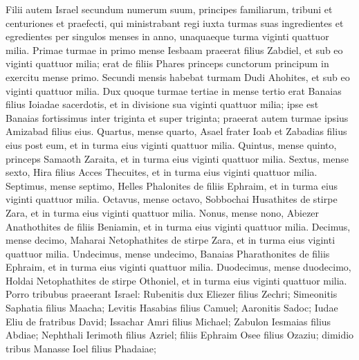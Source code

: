 \begin{biblechapter}
\begin{biblechapter}
\begin{biblechapter}
\begin{biblechapter}
\begin{biblechapter}
\begin{biblechapter}
\begin{biblechapter}
\begin{biblechapter}
\begin{biblechapter}
\begin{biblechapter}
\begin{biblechapter}
\begin{biblechapter}
\begin{biblechapter}
\begin{biblechapter}
\begin{biblechapter}
\begin{biblechapter}
\begin{biblechapter}
\begin{biblechapter}
\begin{biblechapter}
\begin{biblechapter}
\begin{biblechapter}
\begin{biblechapter}
\begin{biblechapter}
\begin{biblechapter}
\begin{biblechapter}
\begin{biblechapter}
\begin{biblechapter}
\verse Filii autem Israel secundum numerum suum, principes familiarum, tribuni et centuriones et praefecti, qui ministrabant regi iuxta turmas suas ingredientes et egredientes per singulos menses in anno, unaquaeque turma viginti quattuor milia. 
\verse Primae turmae in primo mense Iesbaam praeerat filius Zabdiel, et sub eo viginti quattuor milia; 
\verse erat de filiis Phares princeps cunctorum principum in exercitu mense primo. 
\verse Secundi mensis habebat turmam Dudi Ahohites, et sub eo viginti quattuor milia. 
\verse Dux quoque turmae tertiae in mense tertio erat Banaias filius Ioiadae sacerdotis, et in divisione sua viginti quattuor milia; 
\verse ipse est Banaias fortissimus inter triginta et super triginta; praeerat autem turmae ipsius Amizabad filius eius. 
 \verse Quartus, mense quarto, Asael frater Ioab et Zabadias filius eius post eum, et in turma eius viginti quattuor milia. 
\verse Quintus, mense quinto, princeps Samaoth Zaraita, et in turma eius viginti quattuor milia. 
\verse Sextus, mense sexto, Hira filius Acces Thecuites, et in turma eius viginti quattuor milia. 
 \verse Septimus, mense septimo, Helles Phalonites de filiis Ephraim, et in turma eius viginti quattuor milia. 
\verse Octavus, mense octavo, Sobbochai Husathites de stirpe Zara, et in turma eius viginti quattuor milia. 
\verse Nonus, mense nono, Abiezer Anathothites de filiis Beniamin, et in turma eius viginti quattuor milia. 
\verse Decimus, mense decimo, Maharai Netophathites de stirpe Zara, et in turma eius viginti quattuor milia. \verse Undecimus, mense undecimo, Banaias Pharathonites de filiis Ephraim, et in turma eius viginti quattuor milia. 
\verse Duodecimus, mense duodecimo, Holdai Netophathites de stirpe Othoniel, et in turma eius viginti quattuor milia.
 \verse Porro tribubus praeerant Israel: Rubenitis dux Eliezer filius Zechri; Simeonitis Saphatia filius Maacha; 
\verse Levitis Hasabias filius Camuel; Aaronitis Sadoc; \verse Iudae Eliu de fratribus David; Issachar Amri filius Michael; 
 \verse Zabulon Iesmaias filius Abdiae; Nephthali Ierimoth filius Azriel; 
\verse filiis Ephraim Osee filius Ozaziu; dimidio tribus Manasse Ioel filius Phadaiae; 

\end{biblechapter}
\end{biblechapter}
\end{biblechapter}
\end{biblechapter}
\end{biblechapter}
\end{biblechapter}
\end{biblechapter}
\end{biblechapter}
\end{biblechapter}
\end{biblechapter}
\end{biblechapter}
\end{biblechapter}
\end{biblechapter}
\end{biblechapter}
\end{biblechapter}
\end{biblechapter}
\end{biblechapter}
\end{biblechapter}
\end{biblechapter}
\end{biblechapter}
\end{biblechapter}
\end{biblechapter}
\end{biblechapter}
\end{biblechapter}
\end{biblechapter}
\end{biblechapter}
\end{biblechapter}
